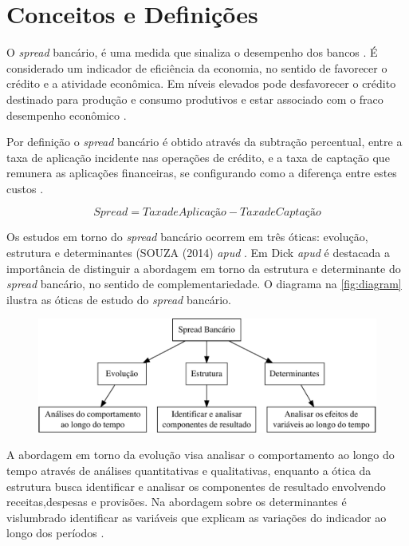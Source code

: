 \documentclass[12pt,openright,oneside,a4paper,chapter=TITLE,section=TITLE,subsection=Title,english,french,spanish,portugues,sumario=tradicional]{04-class-files/abntex2}
\begin{document}
\section{Conceitos e Definições}

O \emph{spread} bancário, é uma medida que sinaliza o desempenho dos bancos
\cite{levine:1997}. É considerado um indicador de eficiência da economia, no
sentido de favorecer o crédito e a atividade econômica. Em níveis elevados pode
desfavorecer o crédito destinado para produção e consumo produtivos e estar
associado com o fraco desempenho econômico \cite{WB:2005}.

Por definição o \emph{spread} bancário é obtido através da subtração percentual,
entre a taxa de aplicação incidente nas operações de crédito, e a taxa de
captação que remunera as aplicações financeiras, se configurando como a
diferença entre estes custos \cite{BCB:2000}.

\[
Spread = Taxa de Aplicação - Taxa de Captação
\]

Os estudos em torno do \emph{spread} bancário ocorrem em três óticas: evolução,
estrutura e determinantes (SOUZA (2014) \emph{apud} \cite{timotio:2018}. Em Dick
\emph{apud} \cite{leal:2006} é destacada a importância de distinguir a abordagem em
torno da estrutura e determinante do \emph{spread} bancário, no sentido de
complementariedade. O diagrama na \autoref{fig:diagram} ilustra as óticas de estudo do \emph{spread} bancário.

\begin{figure}

\begin{center}\includegraphics{12-exportedfigures/diagram.spread-1} \end{center}
\label{fig:diagram}
\end{figure}

A abordagem em torno da evolução visa analisar o comportamento ao longo do tempo através de análises quantitativas e qualitativas, enquanto a ótica da estrutura busca identificar e analisar os componentes de resultado envolvendo receitas,despesas e provisões. Na abordagem sobre os determinantes é vislumbrado identificar as variáveis que explicam as variações do indicador ao longo dos períodos \cite{leal:2006}.
\end{document}
